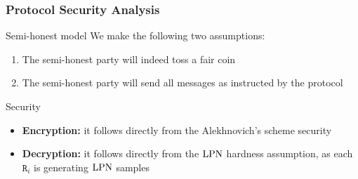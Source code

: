 \begin{frame}
 \frametitle{Protocol Security Analysis }

  \begin{block}{Semi-honest model}
    We make the following two assumptions:
    \begin{enumerate}
      \item The semi-honest party will indeed toss a fair coin
      \item The semi-honest party will send all messages as instructed by the protocol
    \end{enumerate}
  \end{block}

  \begin{block}{Security}
  \begin{itemize}
    \item \textbf{Encryption:} it follows directly from the Alekhnovich's scheme security
    \item \textbf{Decryption:} it follows directly from the $\mathrm{LPN}$ hardness assumption, as each $\mathtt{R}_i$ is generating $\mathrm{LPN}$ samples
  \end{itemize}
  \end{block}
  
\end{frame}
